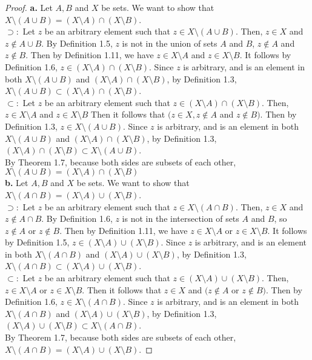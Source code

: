 \documentclass[11pt]{article}
\begin{document}
\begin{proof}
\textbf{a. } Let $A,B$ and $X$ be sets. We want to show that $X\setminus (A\cup B)=(X\setminus A)\cap (X\setminus B)$. \\
$\supset:$ Let $z$ be an arbitrary element such that $z \in X \setminus (A \cup B)$. Then, $z \in X$ and $z\notin A \cup B$. By Definition 1.5, $z$ is not in the union of sets $A$ and $B$, $z \notin A$ and $z \notin B$.
Then by Definition 1.11, we have $z \in X \setminus A$ and $z \in X \setminus B$. It follows by Definition 1.6, $z \in (X \setminus A) \cap (X \setminus B).$ Since $z$ is arbitrary, and is an element in both $X \setminus (A \cup B)$ 
and $(X\setminus A)\cap (X\setminus B)$, by Definition 1.3, $X\setminus (A\cup B) \subset (X\setminus A)\cap (X\setminus B)$. \\
$\subset:$ Let $z$ be an arbitrary element such that $z \in (X\setminus A)\cap (X\setminus B)$. Then, $z \in X \setminus A$ and $z\in X \setminus B$ Then it follows that $(z \in X, z \notin A $ and $ z \notin B)$. Then by Definition 1.3, $z \in X \setminus (A \cup B).$ 
Since $z$ is arbitrary, and is an element in both $X \setminus (A \cup B)$ 
and $(X\setminus A)\cap (X\setminus B)$, by Definition 1.3, $(X\setminus A)\cap (X\setminus B) \subset X\setminus (A\cup B)$. \\
By Theorem 1.7, because both sides are subsets of each other, $X\setminus (A\cup B)=(X\setminus A)\cap (X\setminus B)$ \\
\newline
\textbf{b. } Let $A,B$ and $X$ be sets. We want to show that $X\setminus (A\cap B)=(X\setminus A)\cup (X\setminus B)$. \\
$\supset:$ Let $z$ be an arbitrary element such that $z \in X \setminus (A \cap B)$. Then, $z \in X$ and $z\notin A \cap B$. By Definition 1.6, $z$ is not in the intersection of sets $A$ and $B$, so $z \notin A$ or $z \notin B$.
Then by Definition 1.11, we have $z \in X \setminus A$ or $z \in X \setminus B$. It follows by Definition 1.5, $z \in (X \setminus A) \cup (X \setminus B).$ Since $z$ is arbitrary, and is an element in both $X \setminus (A \cap B)$
and $(X\setminus A)\cup (X\setminus B)$, by Definition 1.3, $X\setminus (A\cap B) \subset (X\setminus A)\cup (X\setminus B)$. \\
$\subset:$ Let $z$ be an arbitrary element such that $z \in (X\setminus A)\cup (X\setminus B)$. Then, $z \in X \setminus A$ or $z\in X \setminus B$. Then it follows that $z \in X$ and $(z \notin A$ or $z \notin B)$. Then by Definition 1.6, $z \in X \setminus (A \cap B).$
Since $z$ is arbitrary, and is an element in both $X \setminus (A \cap B)$
and $(X\setminus A)\cup (X\setminus B)$, by Definition 1.3, $(X\setminus A)\cup (X\setminus B) \subset X\setminus (A\cap B)$. \\
By Theorem 1.7, because both sides are subsets of each other, $X\setminus (A\cap B)=(X\setminus A)\cup (X\setminus B)$.
\end{proof}
\end{document}
